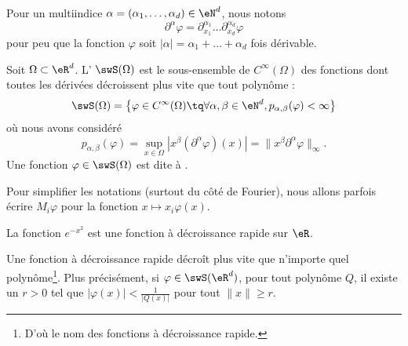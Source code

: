 Pour un multiindice \( \alpha=(\alpha_1,\ldots, \alpha_d)\in \eN^d\), nous notons
\begin{equation}
    \partial^{\alpha}\varphi=\partial_{x_1}^{\alpha_1}\ldots\partial_{x_d}^{\alpha_d}\varphi
\end{equation}
pour peu que la fonction \( \varphi\) soit \( | \alpha |=\alpha_1+\ldots +\alpha_d\) fois dérivable.

\begin{definition}
    Soit \( \Omega\subset\eR^d\). L' \( \swS(\Omega)\) est le sous-ensemble de \(  C^{\infty}(\Omega)\) des fonctions dont toutes les dérivées décroissent plus vite que tout polynôme :
    \begin{equation}
        \swS(\Omega)=\big\{   \varphi\in C^{\infty}(\Omega)\tq\forall \alpha,\beta\in \eN^d, p_{\alpha,\beta}(\varphi)<\infty   \big\}
    \end{equation}
    où nous avons considéré
    \begin{equation}    \label{EqOWdChCu}
        p_{\alpha,\beta}(\varphi)=\sup_{x\in \Omega}| x^{\beta}(\partial^{\alpha}\varphi)(x) |=\| x^{\beta}\partial^{\alpha}\varphi \|_{\infty}.
    \end{equation}
    Une fonction \( \varphi\in\swS(\Omega)\) est dite à .
\end{definition}

Pour simplifier les notations (surtout du côté de Fourier), nous allons parfois écrire \( M_i\varphi\) pour la fonction \( x\mapsto x_i\varphi(x)\).

\begin{example}
    La fonction \(  e^{-x^2}\) est une fonction à décroissance rapide sur \( \eR\).
\end{example}

\begin{proposition} \label{PropCSmzwGv}
    Une fonction à décroissance rapide décroît plus vite que n'importe quel polynôme\footnote{D'où le nom des fonctions à décroissance rapide.}. Plus précisément, si \( \varphi\in\swS(\eR^d)\), pour tout polynôme \( Q\), il existe un \( r>0\) tel que \(  | \varphi(x) |<\frac{1}{ | Q(x) | } \) pour tout \( \| x \|\geq r\).
\end{proposition}

